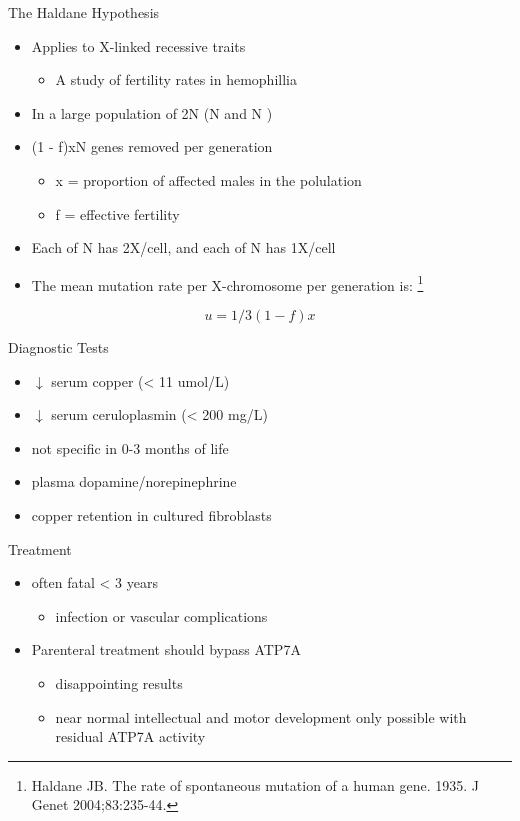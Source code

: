 \documentclass[presentation, smaller]{beamer}
\begin{document}
\begin{frame}[label={sec:org9d66e01}]{The Haldane Hypothesis}
\begin{itemize}
\item Applies to X-linked recessive traits
\begin{itemize}
\item A study of fertility rates in hemophillia
\end{itemize}

\item In a large population of 2N (N \male{} and N \female)
\item (1 - f)xN genes removed per generation
\begin{itemize}
\item x = proportion of affected males in the polulation
\item f = effective fertility
\end{itemize}

\item Each of N \female{} has 2X/cell, and each of N \male{} has 1X/cell
\item The mean mutation rate per X-chromosome per generation is: \footnote{Haldane JB. The rate of spontaneous mutation of a human gene. 1935. J Genet 2004;83:235-44.}
\end{itemize}

\[
u = 1/3(1 - f)x  
\]
\end{frame}


\begin{frame}[label={sec:org6018370}]{Diagnostic Tests}
\begin{itemize}
\item \(\downarrow\) serum copper (< 11 umol/L)
\item \(\downarrow\) serum ceruloplasmin (< 200 mg/L)
\item not specific in 0-3 months of life
\item plasma dopamine/norepinephrine
\item copper retention in cultured fibroblasts
\end{itemize}
\end{frame}

\begin{frame}[label={sec:orga2f0119}]{Treatment}
\begin{itemize}
\item often fatal < 3 years
\begin{itemize}
\item infection or vascular complications
\end{itemize}
\item Parenteral treatment should bypass ATP7A
\begin{itemize}
\item disappointing results
\item near normal intellectual and motor development only possible with
residual ATP7A activity
\end{itemize}
\end{itemize}
\end{frame}
\end{document}

